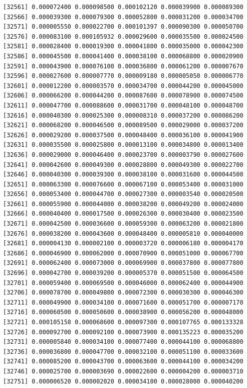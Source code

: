 \documentclass[]{article}
\begin{document}
\begin{verbatim}
[32561] 0.000072400 0.000098500 0.000102120 0.000039900 0.000089300
[32566] 0.000039300 0.000079300 0.000052800 0.000031200 0.000034700
[32571] 0.000005550 0.000022700 0.000101397 0.000090300 0.000050700
[32576] 0.000083100 0.000105932 0.000029600 0.000035500 0.000024500
[32581] 0.000028400 0.000019300 0.000041800 0.000035000 0.000042300
[32586] 0.000045500 0.000041400 0.000038100 0.000068800 0.000020900
[32591] 0.000043900 0.000076100 0.000036800 0.000061200 0.000007670
[32596] 0.000027600 0.000007770 0.000009180 0.000005050 0.000006770
[32601] 0.000012200 0.000003570 0.000034700 0.000044200 0.000045000
[32606] 0.000066200 0.000044200 0.000087600 0.000078900 0.000074500
[32611] 0.000047700 0.000088600 0.000031700 0.000048100 0.000048700
[32616] 0.000040300 0.000025300 0.000008310 0.000037200 0.000086200
[32621] 0.000068200 0.000046500 0.000089500 0.000029000 0.000037200
[32626] 0.000029200 0.000037500 0.000048400 0.000036100 0.000041900
[32631] 0.000035500 0.000025800 0.000013100 0.000034800 0.000013400
[32636] 0.000029000 0.000046400 0.000023700 0.000003790 0.000027600
[32641] 0.000042600 0.000049300 0.000028800 0.000049300 0.000022700
[32646] 0.000040300 0.000039300 0.000038100 0.000031600 0.000044500
[32651] 0.000063300 0.000076600 0.000067100 0.000053400 0.000031000
[32656] 0.000053400 0.000044700 0.000027300 0.000003540 0.000020500
[32661] 0.000055900 0.000044000 0.000038200 0.000049200 0.000024000
[32666] 0.000040400 0.000017500 0.000026300 0.000030400 0.000023500
[32671] 0.000042500 0.000036600 0.000059300 0.000063200 0.000021800
[32676] 0.000038200 0.000043600 0.000048400 0.000005810 0.000040000
[32681] 0.000004130 0.000002100 0.000003720 0.000006180 0.000004170
[32686] 0.000046900 0.000062000 0.000070900 0.000051000 0.000067700
[32691] 0.000062400 0.000073000 0.000069900 0.000037800 0.000077800
[32696] 0.000042700 0.000039200 0.000005370 0.000051500 0.000064500
[32701] 0.000059400 0.000069500 0.000046000 0.000062400 0.000044900
[32706] 0.000078700 0.000049800 0.000072300 0.000030300 0.000046300
[32711] 0.000049900 0.000034100 0.000071600 0.000051700 0.000007170
[32716] 0.000060500 0.000050600 0.000038900 0.000056200 0.000048000
[32721] 0.000105158 0.000068600 0.000097300 0.000107765 0.000133328
[32726] 0.000092700 0.000092100 0.000073900 0.000135223 0.000035200
[32731] 0.000005840 0.000034100 0.000077400 0.000044100 0.000068800
[32736] 0.000036800 0.000047700 0.000032100 0.000051100 0.000033600
[32741] 0.000085200 0.000043700 0.000063600 0.000044100 0.000034200
[32746] 0.000025700 0.000003690 0.000022600 0.000004200 0.000003710
[32751] 0.000006520 0.000002020 0.000034100 0.000028000 0.000040200

\end{verbatim}
\end{document}
